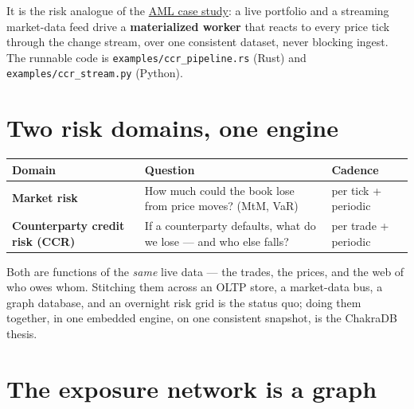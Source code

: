 \documentclass[
  11pt,
  openany]{book}
\begin{document}
It is the risk analogue of the \href{aml.md}{AML case study}: a live
portfolio and a streaming market-data feed drive a \textbf{materialized
worker} that reacts to every price tick through the change stream, over
one consistent dataset, never blocking ingest. The runnable code is
\texttt{examples/ccr\_pipeline.rs} (Rust) and
\texttt{examples/ccr\_stream.py} (Python).

\section{Two risk domains, one
engine}\label{two-risk-domains-one-engine}

\begin{longtable}[]{@{}
  >{\raggedright\arraybackslash}p{}
  >{\raggedright\arraybackslash}p{}
  >{\raggedright\arraybackslash}p{}@{}}
\toprule\noalign{}
\begin{minipage}[b]{\linewidth}\raggedright
Domain
\end{minipage} & \begin{minipage}[b]{\linewidth}\raggedright
Question
\end{minipage} & \begin{minipage}[b]{\linewidth}\raggedright
Cadence
\end{minipage} \\
\midrule\noalign{}
\endhead
\bottomrule\noalign{}
\endlastfoot
\textbf{Market risk} & How much could the book lose from price moves?
(MtM, VaR) & per tick + periodic \\
\textbf{Counterparty credit risk (CCR)} & If a counterparty defaults,
what do we lose --- and who else falls? & per trade + periodic \\
\end{longtable}

Both are functions of the \emph{same} live data --- the trades, the
prices, and the web of who owes whom. Stitching them across an OLTP
store, a market-data bus, a graph database, and an overnight risk grid
is the status quo; doing them together, in one embedded engine, on one
consistent snapshot, is the ChakraDB thesis.

\section{The exposure network is a
graph}\label{the-exposure-network-is-a-graph}
\end{document}
